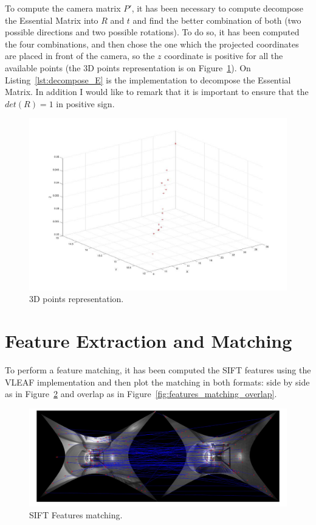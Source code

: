 \documentclass{ethz_report}
\begin{document}
To compute the camera matrix $P'$, it has been necessary to compute decompose the Essential Matrix
into $R$ and $t$ and find the better combination of both (two possible directions and two possible
rotations). To do so, it has been computed the four combinations, and then chose the one which the
projected coordinates are placed in front of the camera, so the $z$ coordinate is positive for all
the available points (the 3D points representation is on Figure~\ref{fig:3d_points}). On Listing~\ref{lst:decompose_E} is the implementation to decompose the
Essential Matrix. In addition I would like to remark that it is important to ensure that the
$det(R) = 1$ in positive sign.



\begin{figure}[H]
\centering
\includegraphics[width=.7\linewidth]{images/3d_essential_m}
\caption{3D points representation.}
\label{fig:3d_points}
\end{figure}

\section*{Feature Extraction and Matching}

To perform a feature matching, it has been computed the SIFT features using the VLEAF implementation
and then plot the matching in both formats: side by side as in Figure~\ref{fig:features_matching}
and overlap as in Figure~\ref{fig:features_matching_overlap}.

\begin{figure}[H]
\centering
\includegraphics[width=1\linewidth]{images/sift_matching}
\caption{SIFT Features matching.}
\label{fig:features_matching}
\end{figure}
\end{document}
